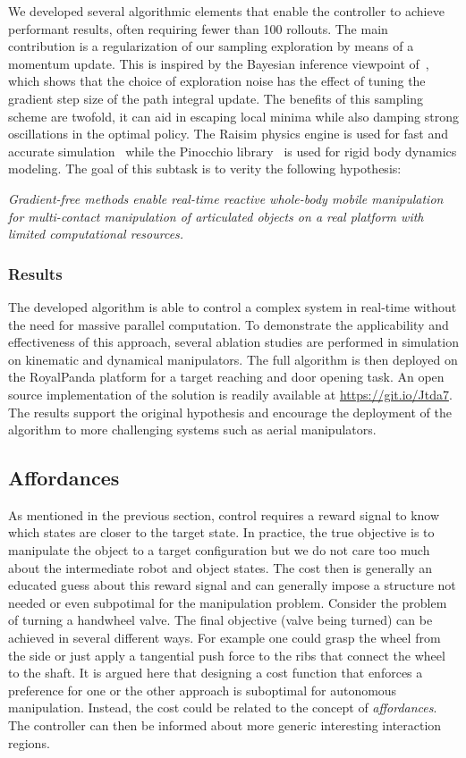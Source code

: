 We developed several algorithmic elements that enable the controller to achieve performant results, often requiring fewer than 100 rollouts. The main contribution is a regularization of our sampling exploration by means of a momentum update. This is inspired by the Bayesian inference viewpoint of~\cite{lambert_stein_2020}, which shows that the choice of exploration noise has the effect of tuning the gradient step size of the path integral update. The benefits of this sampling scheme are twofold, it can aid in escaping local minima while also damping strong oscillations in the optimal policy. The Raisim physics engine is used for fast and accurate simulation~\cite{raisim} while the Pinocchio library~\cite{pinocchioweb} is used for rigid body dynamics modeling. The goal of this subtask is to verity the following hypothesis:
\begin{displayquote}
\textit{Gradient-free methods enable real-time reactive whole-body mobile manipulation for multi-contact manipulation of articulated objects on a real platform with limited computational resources.}
\end{displayquote}

\subsubsection{Results}
The developed algorithm is able to control a complex system in real-time without the need for massive parallel computation. To demonstrate the applicability and effectiveness of this approach, several ablation studies are performed in simulation on kinematic and dynamical manipulators. The full algorithm is then deployed on the RoyalPanda platform for a target reaching and door opening task. An open source implementation of the solution is readily available at \url{https://git.io/Jtda7}. The results support the original hypothesis and encourage the deployment of the algorithm to more challenging systems such as aerial manipulators.

\subsection{Affordances}
As mentioned in the previous section, control requires a reward signal to know which states are closer to the target state. In practice, the true objective is to manipulate the object to a target configuration but we do not care too much about the intermediate robot and object states. The cost then is generally an educated guess about this reward signal and can generally impose a structure not needed or even subpotimal for the manipulation problem. Consider the problem of turning a handwheel valve. The final objective (valve being turned) can be achieved in several different ways. For example one could grasp the wheel from the side or just apply a tangential push force to the ribs that connect the wheel to the shaft. It is argued here that designing a cost function that enforces a preference for one or the other approach is suboptimal for autonomous manipulation. Instead, the cost could be related to the concept of \emph{affordances}. The controller can then be informed about more generic interesting interaction regions.

